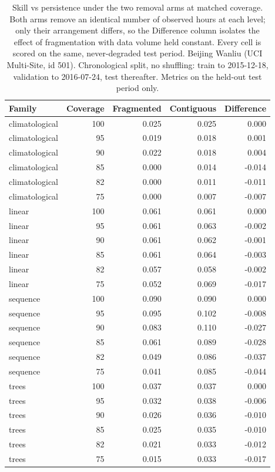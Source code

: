 \begin{table}[htbp]
\caption{Skill vs persistence under the two removal arms at matched coverage. Both arms remove an identical number of observed hours at each level; only their arrangement differs, so the Difference column isolates the effect of fragmentation with data volume held constant. Every cell is scored on the same, never-degraded test period. Beijing Wanliu (UCI Multi-Site, id 501). Chronological split, no shuffling: train to 2015-12-18, validation to 2016-07-24, test thereafter. Metrics on the held-out test period only.}
\label{tab:ablation_arm_gap}
\begin{tabular}{lrrrr}
\toprule
Family & Coverage & Fragmented & Contiguous & Difference \\
\midrule
climatological & 100 & 0.025 & 0.025 & 0.000 \\
climatological & 95 & 0.019 & 0.018 & 0.001 \\
climatological & 90 & 0.022 & 0.018 & 0.004 \\
climatological & 85 & 0.000 & 0.014 & -0.014 \\
climatological & 82 & 0.000 & 0.011 & -0.011 \\
climatological & 75 & 0.000 & 0.007 & -0.007 \\
linear & 100 & 0.061 & 0.061 & 0.000 \\
linear & 95 & 0.061 & 0.063 & -0.002 \\
linear & 90 & 0.061 & 0.062 & -0.001 \\
linear & 85 & 0.061 & 0.064 & -0.003 \\
linear & 82 & 0.057 & 0.058 & -0.002 \\
linear & 75 & 0.052 & 0.069 & -0.017 \\
sequence & 100 & 0.090 & 0.090 & 0.000 \\
sequence & 95 & 0.095 & 0.102 & -0.008 \\
sequence & 90 & 0.083 & 0.110 & -0.027 \\
sequence & 85 & 0.061 & 0.089 & -0.028 \\
sequence & 82 & 0.049 & 0.086 & -0.037 \\
sequence & 75 & 0.041 & 0.085 & -0.044 \\
trees & 100 & 0.037 & 0.037 & 0.000 \\
trees & 95 & 0.032 & 0.038 & -0.006 \\
trees & 90 & 0.026 & 0.036 & -0.010 \\
trees & 85 & 0.025 & 0.035 & -0.010 \\
trees & 82 & 0.021 & 0.033 & -0.012 \\
trees & 75 & 0.015 & 0.033 & -0.017 \\
\bottomrule
\end{tabular}
\end{table}

